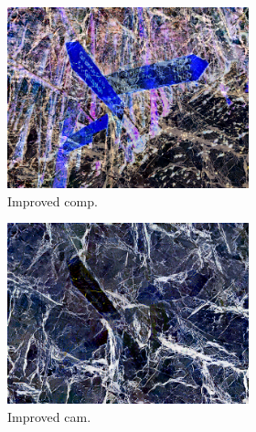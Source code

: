 \begin{figure}[]
\begin{subfigure}{\textwidth}
        \begin{subfigure}{0.24\textwidth}
            \centering
            \includegraphics[width=\textwidth]{images/04-experiment02/photo/marble/improved_im.jpg}
            \caption*{Improved comp.}
        \end{subfigure}
        \hfill
        \begin{subfigure}{0.24\textwidth}
            \centering
            \includegraphics[width=\textwidth]{images/04-experiment02/photo/marble/improved_proj.jpg}
            \caption*{Improved cam.}
        \end{subfigure}
        \hfill
        \begin{subfigure}{0.24\textwidth}
            \centering

\end{subfigure}
\end{subfigure}
\end{figure}
